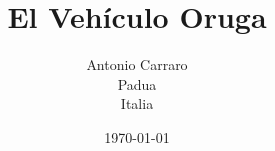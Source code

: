 
\title{\huge\bf El Vehículo Oruga}
\author{\large Antonio Carraro\\[1mm]
 Padua\\
 Italia}
\date{\today}
\maketitle

